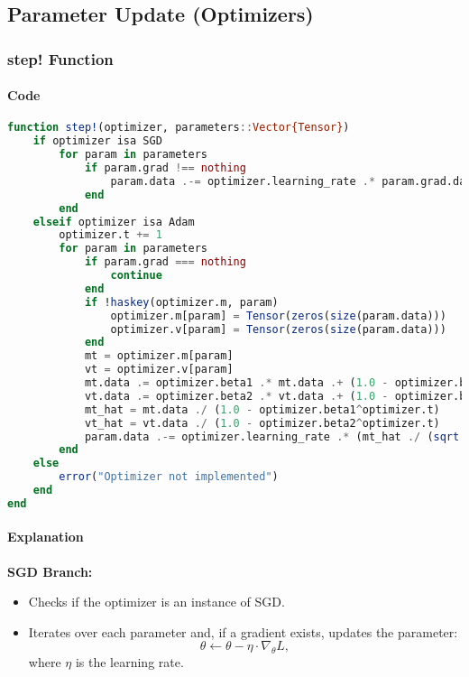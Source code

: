 \documentclass[11pt]{article}
\begin{document}
\subsection{Parameter Update (Optimizers)}
\subsubsection{step! Function}
\paragraph{Code}
\begin{lstlisting}[language=Julia]
function step!(optimizer, parameters::Vector{Tensor})
    if optimizer isa SGD
        for param in parameters
            if param.grad !== nothing
                param.data .-= optimizer.learning_rate .* param.grad.data
            end
        end
    elseif optimizer isa Adam
        optimizer.t += 1
        for param in parameters
            if param.grad === nothing
                continue
            end
            if !haskey(optimizer.m, param)
                optimizer.m[param] = Tensor(zeros(size(param.data)))
                optimizer.v[param] = Tensor(zeros(size(param.data)))
            end
            mt = optimizer.m[param]
            vt = optimizer.v[param]
            mt.data .= optimizer.beta1 .* mt.data .+ (1.0 - optimizer.beta1) .* param.grad.data
            vt.data .= optimizer.beta2 .* vt.data .+ (1.0 - optimizer.beta2) .* (param.grad.data .^ 2)
            mt_hat = mt.data ./ (1.0 - optimizer.beta1^optimizer.t)
            vt_hat = vt.data ./ (1.0 - optimizer.beta2^optimizer.t)
            param.data .-= optimizer.learning_rate .* (mt_hat ./ (sqrt.(vt_hat) .+ optimizer.epsilon))
        end
    else
        error("Optimizer not implemented")
    end
end
\end{lstlisting}

\paragraph{Explanation}
\textbf{SGD Branch:}
\begin{itemize}
    \item Checks if the optimizer is an instance of SGD.
    \item Iterates over each parameter and, if a gradient exists, updates the parameter:
    \[
    \theta \leftarrow \theta - \eta \cdot \nabla_{\theta}L,
    \]
    where \(\eta\) is the learning rate.
\end{itemize}
\end{document}
